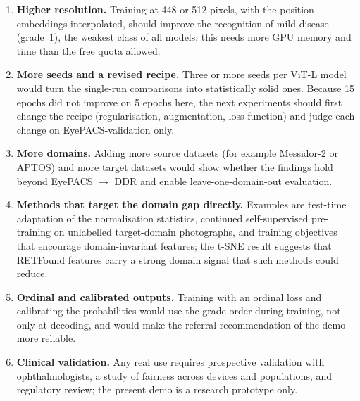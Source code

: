 \begin{enumerate}[leftmargin=1.5em]
    \item \textbf{Higher resolution.} Training at 448 or 512 pixels, with the position embeddings interpolated, should improve the recognition of mild disease (grade~1), the weakest class of all models; this needs more GPU memory and time than the free quota allowed.
    \item \textbf{More seeds and a revised recipe.} Three or more seeds per ViT-L model would turn the single-run comparisons into statistically solid ones. Because 15 epochs did not improve on 5 epochs here, the next experiments should first change the recipe (regularisation, augmentation, loss function) and judge each change on EyePACS-validation only.
    \item \textbf{More domains.} Adding more source datasets (for example Messidor-2 or APTOS) and more target datasets would show whether the findings hold beyond EyePACS $\rightarrow$ DDR and enable leave-one-domain-out evaluation.
    \item \textbf{Methods that target the domain gap directly.} Examples are test-time adaptation of the normalisation statistics, continued self-supervised pre-training on unlabelled target-domain photographs, and training objectives that encourage domain-invariant features; the t-SNE result suggests that RETFound features carry a strong domain signal that such methods could reduce.
    \item \textbf{Ordinal and calibrated outputs.} Training with an ordinal loss and calibrating the probabilities would use the grade order during training, not only at decoding, and would make the referral recommendation of the demo more reliable.
    \item \textbf{Clinical validation.} Any real use requires prospective validation with ophthalmologists, a study of fairness across devices and populations, and regulatory review; the present demo is a research prototype only.
\end{enumerate}
